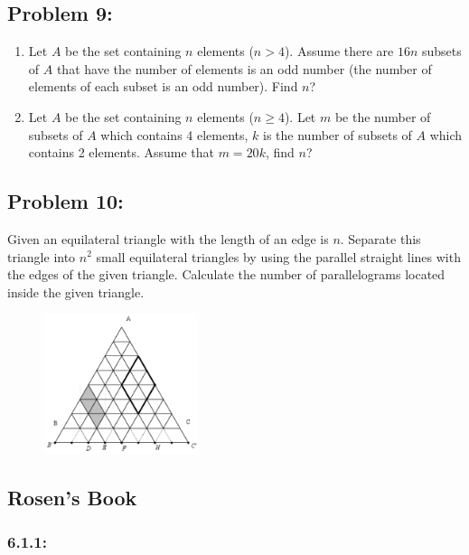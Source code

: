 \documentclass[12pt,en,a4paper]{article}
\begin{document}
	\subsection*{Problem 9:}
	\begin{enumerate}
		\item Let $A$ be the set containing $n$ elements ($n > 4$). Assume there are $16n$ subsets of $A$ that have the number of elements is an odd number (the number of elements of each subset is an odd number). Find $n$?
		\item Let $A$ be the set containing $n$ elements ($n \geq 4$). Let $m$ be the number of subsets of $A$ which contains 4 elements, $k$ is the number of subsets of $A$ which contains 2 elements. Assume that $m = 20k$, find $n$?
	\end{enumerate}
	
	\subsection*{Problem 10:}
	Given an equilateral triangle with the length of an edge is $n$. Separate this triangle into $n^2$ small equilateral triangles by using the parallel straight lines with the edges of the given triangle. Calculate the number of parallelograms located inside the given triangle.
	\begin{figure}[h]
		\centering
		\includegraphics[width=0.4\textwidth]{cprob10.png}
		\label{fig:cprob10}
	\end{figure}
	
	\subsection*{Rosen's Book}
	\subsubsection*{6.1.1:}
	
\end{document}
